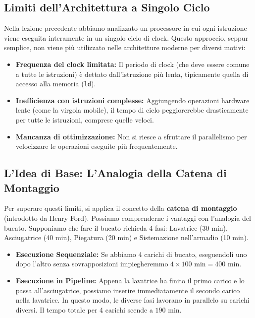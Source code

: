 \documentclass[12pt, a4paper]{article}
\begin{document}
\subsection{Limiti dell'Architettura a Singolo Ciclo}
Nella lezione precedente abbiamo analizzato un processore in cui ogni istruzione viene eseguita interamente in un singolo ciclo di clock. Questo approccio, seppur semplice, non viene più utilizzato nelle architetture moderne per diversi motivi:
\begin{itemize}
    \item \textbf{Frequenza del clock limitata:} Il periodo di clock (che deve essere comune a tutte le istruzioni) è dettato dall'istruzione più lenta, tipicamente quella di accesso alla memoria (\texttt{ld}).
    \item \textbf{Inefficienza con istruzioni complesse:} Aggiungendo operazioni hardware lente (come la virgola mobile), il tempo di ciclo peggiorerebbe drasticamente per tutte le istruzioni, comprese quelle veloci.
    \item \textbf{Mancanza di ottimizzazione:} Non si riesce a sfruttare il parallelismo per velocizzare le operazioni eseguite più frequentemente.
\end{itemize}

\subsection{L'Idea di Base: L'Analogia della Catena di Montaggio}
Per superare questi limiti, si applica il concetto della \textbf{catena di montaggio} (introdotto da Henry Ford). Possiamo comprenderne i vantaggi con l'analogia del bucato. Supponiamo che fare il bucato richieda 4 fasi: Lavatrice (30 min), Asciugatrice (40 min), Piegatura (20 min) e Sistemazione nell'armadio (10 min).

\begin{itemize}
    \item \textbf{Esecuzione Sequenziale:} Se abbiamo 4 carichi di bucato, eseguendoli uno dopo l'altro senza sovrapposizioni impiegheremmo $4 \times 100 \text{ min} = 400 \text{ min}$.
    \item \textbf{Esecuzione in Pipeline:} Appena la lavatrice ha finito il primo carico e lo passa all'asciugatrice, possiamo inserire immediatamente il secondo carico nella lavatrice. In questo modo, le diverse fasi lavorano in parallelo su carichi diversi. Il tempo totale per 4 carichi scende a $190 \text{ min}$.
\end{itemize}
\end{document}
